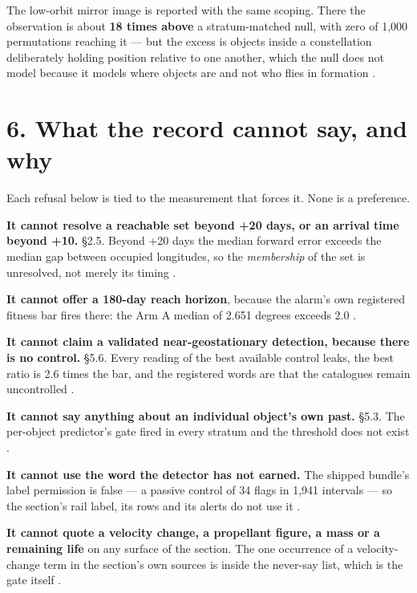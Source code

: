 \documentclass[11pt]{article}
\begin{document}
The low-orbit mirror image is reported with the same scoping. There the observation is about \textbf{18 times above} a stratum-matched null, with zero of 1,000 permutations reaching it --- but the excess is objects inside a constellation deliberately holding position relative to one another, which the null does not model because it models where objects are and not who flies in formation%
.

\section*{6. What the record cannot say, and why}

Each refusal below is tied to the measurement that forces it. None is a preference.

\textbf{It cannot resolve a reachable set beyond +20 days, or an arrival time beyond +10.} \S{}2.5. Beyond +20 days the median forward error exceeds the median gap between occupied longitudes, so the \emph{membership} of the set is unresolved, not merely its timing%
.

\textbf{It cannot offer a 180-day reach horizon}, because the alarm's own registered fitness bar fires there: the Arm A median of 2.651 degrees exceeds 2.0%
.

\textbf{It cannot claim a validated near-geostationary detection, because there is no control.} \S{}5.6. Every reading of the best available control leaks, the best ratio is 2.6 times the bar, and the registered words are that the catalogues remain uncontrolled%
.

\textbf{It cannot say anything about an individual object's own past.} \S{}5.3. The per-object predictor's gate fired in every stratum and the threshold does not exist%
.

\textbf{It cannot use the word the detector has not earned.} The shipped bundle's label permission is false --- a passive control of 34 flags in 1,941 intervals --- so the section's rail label, its rows and its alerts do not use it%
.

\textbf{It cannot quote a velocity change, a propellant figure, a mass or a remaining life} on any surface of the section. The one occurrence of a velocity-change term in the section's own sources is inside the never-say list, which is the gate itself%
.
\end{document}

